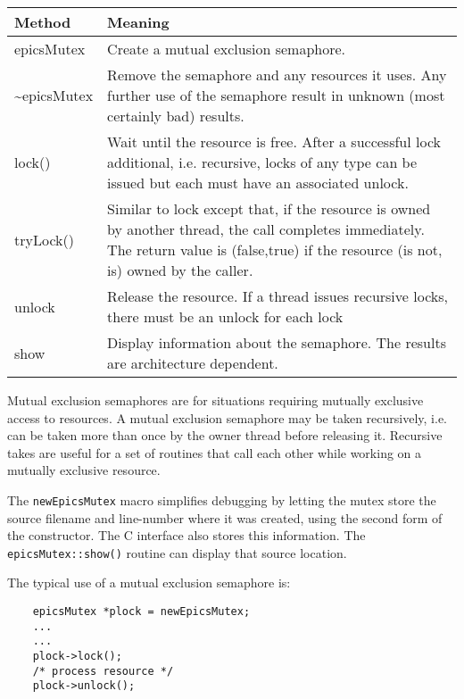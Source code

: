 \begin{center}
\begin{longtable}{p{1.38889in}p{5.0in}}
\textbf{Method} & \textbf{Meaning}\\
\hline
epicsMutex & Create a mutual exclusion semaphore.\\
\~{}epicsMutex & Remove the semaphore and any resources it uses.
Any further use of the semaphore result in unknown (most certainly bad) results.\\
lock() & Wait until the resource is free.
After a successful lock additional, i.e. recursive, locks of any type can be issued but each must have an associated unlock.\\
tryLock() & Similar to lock except that, if the resource is owned by another thread, the call completes immediately.
The return value is (false,true) if the resource (is not, is) owned by the caller.\\
unlock & Release the resource.
If a thread issues recursive locks, there must be an unlock for each lock\\
show & Display information about the semaphore.
The results are architecture dependent.
\end{longtable}

\end{center}


Mutual exclusion semaphores are for situations requiring mutually exclusive access to resources.
A mutual exclusion semaphore may be taken recursively, i.e. can be taken more than once by the owner thread before releasing it.
Recursive takes are useful for a set of routines that call each other while working on a mutually exclusive resource.

The \verb|newEpicsMutex| macro simplifies debugging by letting the mutex store the source filename and line-number where it was created, using the second form of the constructor.
The C interface also stores this information.
The \verb|epicsMutex::show()| routine can display that source location.

The typical use of a mutual exclusion semaphore is:

\begin{verbatim}
    epicsMutex *plock = newEpicsMutex;
    ...
    ...
    plock->lock();
    /* process resource */
    plock->unlock();
\end{verbatim}

